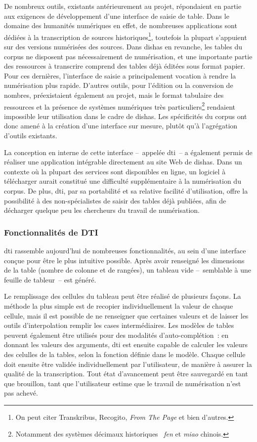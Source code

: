 \documentclass[a4paper,12pt,twoside]{book}
\newcommand{\eng}{\emph}
\newcommand{\g}[1]{\og#1~\fg}
\newcommand{\dishas}{\gls{dishas}\xspace}
\newcommand{\dti}{\gls{dti}\xspace}
\begin{document}
De nombreux outils, existants antérieurement au projet, répondaient en partie aux exigences de développement d'une interface de saisie de table. Dans le domaine des humanités numériques en effet, de nombreuses applications sont dédiées à la transcription de sources historiques\footnote{On peut citer Transkribus, Recogito, \eng{From The Page} et bien d'autres.}, toutefois la plupart s'appuient sur des versions numérisées des sources. Dans \dishas en revanche, les tables du corpus ne disposent pas nécessairement de numérisation, et une importante partie des ressources à transcrire comprend des tables déjà éditées sous format papier. Pour ces dernières, l'interface de saisie a principalement vocation à rendre la numérisation plus rapide. D'autres outils, pour l'édition ou la conversion de nombres, préexistaient également au projet, mais le format tabulaire des ressources et la présence de systèmes numériques très particuliers\footnote{Notamment des systèmes \g{décimaux historiques} \eng{fen} et \eng{miao} chinois.} rendaient impossible leur utilisation dans le cadre de \dishas. Les spécificités du corpus ont donc amené à la création d'une interface sur mesure, plutôt qu'à l'agrégation d'outils existants.

La conception en interne de cette interface –~appelée \dti~– a également permis de réaliser une application intégrable directement au site Web de \dishas. Dans un contexte où la plupart des services sont disponibles en ligne, un logiciel à télécharger aurait constitué une difficulté supplémentaire à la numérisation du corpus. De plus, \dti, par sa portabilité et sa relative facilité d'utilisation, offre la possibilité à des non-spécialistes de saisir des tables déjà publiées, afin de décharger quelque peu les chercheurs du travail de numérisation.

			\subsubsection{Fonctionnalités de DTI}
\dti rassemble aujourd'hui de nombreuses fonctionnalités, au sein d'une interface conçue pour être le plus intuitive possible. Après avoir renseigné les dimensions de la table (nombre de colonne et de rangées), un tableau vide –~semblable à une feuille de tableur~– est généré.

Le remplissage des cellules du tableau peut être réalisé de plusieurs façons. La méthode la plus simple est de recopier individuellement la valeur de chaque cellule, mais il est possible de ne renseigner que certaines valeurs et de laisser les outils d'interpolation remplir les cases intermédiaires. Les modèles de tables peuvent également être utilisés pour des modalités d'auto-complétion~: en donnant les valeurs des arguments, \dti est ensuite capable de calculer les valeurs des celulles de la tables, selon la fonction définie dans le modèle. Chaque cellule doit ensuite être validée individuellement par l'utilisateur, de manière à assurer la qualité de la transcription. Tout état d'avancement peut être sauvegardé en tant que brouillon, tant que l'utilisateur estime que le travail de numérisation n'est pas achevé.
\end{document}
